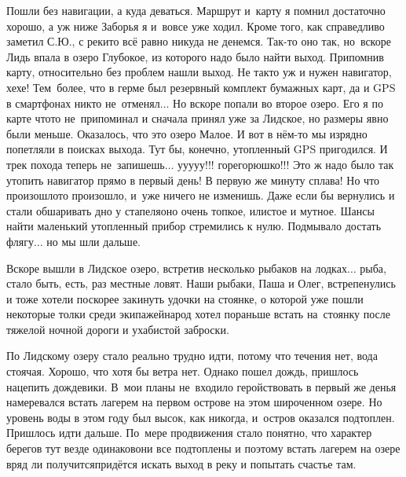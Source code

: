 Пошли без навигации, а куда деваться. Маршрут и~карту я помнил достаточно хорошо, а уж ниже Заборья я и~вовсе уже ходил. Кроме того, как справедливо заметил С.Ю., с реки\sdash то всё равно никуда не денемся. Так-то оно так, но~вскоре Лидь впала в озеро Глубокое, из которого надо было найти выход. Припомнив карту, относительно без проблем нашли выход. Не так\sdash то уж и нужен навигатор, хе\sdash хе! Тем~более, что в герме был резервный комплект бумажных карт, да и GPS в смартфонах никто не~отменял$\ldots$ Но вскоре попали во второе озеро. Его я по карте что\sdash то не~припоминал и сначала принял уже за Лидское, но размеры явно были меньше. Оказалось, что это озеро Малое. И вот в нём-то мы изрядно попетляли в поисках выхода. Тут бы, конечно, утопленный GPS пригодился. И трек похода теперь не~запишешь$\ldots$ у\sdash у\sdash у\sdash у\sdash у!!! горе\sdash горюшко!!! Это ж надо было так утопить навигатор прямо в первый день! В первую же минуту сплава! Но что произошло\mdash то произошло, и~уже ничего не изменишь. Даже если бы вернулись и стали обшаривать дно у стапеля\mdash оно очень топкое, илистое и мутное. Шансы найти маленький утопленный прибор стремились к нулю. Подмывало достать флягу$\ldots$ но мы шли дальше.

Вскоре вышли в Лидское озеро, встретив несколько рыбаков на лодках$\ldots$ рыба, стало быть, есть, раз местные ловят. Наши рыбаки, Паша и Олег, встрепенулись и тоже хотели поскорее закинуть удочки на стоянке, о которой уже пошли некоторые толки среди экипажей\mdash народ хотел пораньше встать на~стоянку после тяжелой ночной дороги и ухабистой заброски. 

По Лидскому озеру стало реально трудно идти, потому что течения нет, вода стоячая. Хорошо, что хотя бы ветра нет. Однако пошел дождь, пришлось нацепить дождевики. В~мои планы не~входило геройствовать в первый же день\mdash я намеревался встать лагерем на первом острове на этом широченном озере. Но уровень воды в этом году был высок, как никогда, и~остров оказался подтоплен. Пришлось идти дальше. По~мере продвижения стало понятно, что характер берегов тут везде одинаков\mdash они все подтоплены и поэтому встать лагерем на озере вряд ли получится\mdash придётся искать выход в реку и попытать счастье там. 

